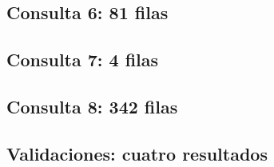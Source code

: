\documentclass[10pt,letterpaper]{article}
\begin{document}
\subsection{Consulta 6: 81 filas}


\subsection{Consulta 7: 4 filas}


\subsection{Consulta 8: 342 filas}


\subsection{Validaciones: cuatro resultados}

\end{document}
